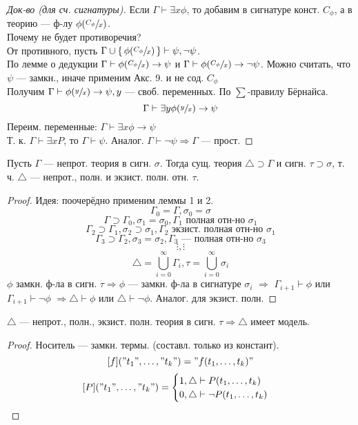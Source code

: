 \begin{proof}[Док-во (для сч. сигнатуры)]
Если $\Gamma \vdash \exists x \phi$, то добавим в сигнатуре конст. $C_\phi$, а в теорию --- ф-лу $\phi(\sfrac{C_\phi}{x})$. \\
Почему не будет противоречия? \\ 
От противного, пусть $\Gamma \cup \set{\phi(\sfrac{C_\phi}{x})} \vdash \psi, \neg \psi$. \\
По лемме о дедукции $\Gamma \vdash \phi(\sfrac{C_\phi}{x}) \rightarrow \psi$ и $\Gamma \vdash \phi(\sfrac{C_\phi}{x}) \rightarrow \neg \psi$. Можно считать, что $\psi$ --- замкн., иначе применим Акс. 9. и не сод. $C_\phi$ \\
Получим $\Gamma \vdash \phi(\sfrac{y}{x}) \rightarrow \psi, y$ --- своб. переменных. По $\sum$-правилу Бёрнайса.
\[
\Gamma \vdash \exists y \phi (\sfrac{y}{x}) \rightarrow \psi
\]
Переим. переменные: $\Gamma \vdash \exists x \phi \rightarrow \psi$ \\
Т. к. $\Gamma \vdash \exists x P$, то $\Gamma \vdash \psi$. Аналог. $\Gamma \vdash \neg \psi \Rightarrow \Gamma$ --- прост.
\end{proof}
\begin{lemma}[III.]
  Пусть $\Gamma$ --- непрот. теория в сигн. $\sigma$. Тогда сущ. теория $\triangle \supset  \Gamma$ и сигн. $\tau \supset \sigma$, т. ч. $\triangle$ --- непрот., полн. и экзист. полн. отн. $\tau$.
\end{lemma}
\begin{proof}
Идея: поочерёдно применим леммы 1 и 2.
\[
\Gamma_0 = \Gamma, \sigma_0 = \sigma
\]
\[
\Gamma \supset \Gamma_0, \sigma_1 = \sigma_0, \Gamma_1 \text{ полная отн-но $\sigma_1$}
\]
\[
\Gamma_2 \supset \Gamma_1, \sigma_2 \supset \sigma_1, \Gamma_2 \text{ экзист. полная отн-но $\sigma_1$} 
\]
\[
  \Gamma_3 \supset \Gamma_2, \sigma_3 = \sigma_2, \Gamma_3 \text{ --- полная отн-но $\sigma_3$}
\]
\[
\vdots, \vdots
\]
\[
\triangle = \bigcup_{i = 0}^{\infty} \Gamma_i, \tau = \bigcup_{i = 0}^{\infty} \sigma_i
\] 
$\phi$ замкн. ф-ла в сигн. $\tau \Rightarrow \phi$ --- замкн. ф-ла в сигнатуре $\sigma_i$ $\Rightarrow$ $\Gamma_{i + 1} \vdash \phi$ или $\Gamma_{i + 1} \vdash \neg \phi$ $\Rightarrow \triangle \vdash \phi$ или $\triangle \vdash \neg \phi$. Аналог. для экзист. полн.
\end{proof}
\begin{lemma}[IV]
$\triangle$ --- непрот., полн., экзист. полн. теория в сигн. $\tau \Rightarrow \triangle$ имеет модель.
\end{lemma}
\begin{proof}
Носитель --- замкн. термы. (составл. только из констант).
\[
[f]("t_1", \ldots, "t_k") = "f(t_1, \ldots, t_k)"
\]
\[
[P]("t_1", \ldots, "t_k") = \begin{cases}
1, \triangle \vdash P(t_1, \ldots, t_k) \\
0, \triangle \vdash \neg P(t_1, \ldots, t_k)
\end{cases}
\]
\end{proof}

